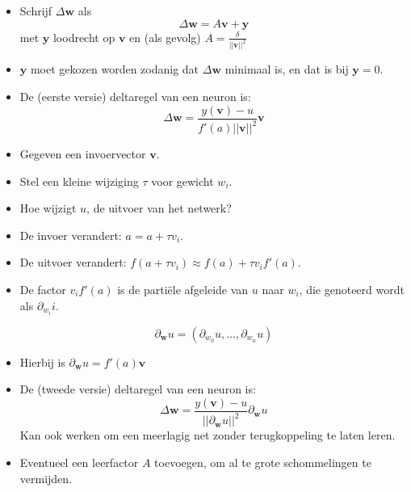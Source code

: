 \begin{itemize}
\begin{enumerate}
\begin{itemize}
\begin{itemize}
                \item Schrijf $\Delta \textbf{w}$ als
                $$\Delta \textbf{w} = A\textbf{v} + \textbf{y}$$
                met $\textbf{y}$ loodrecht op $\textbf{v}$ en (als gevolg) $A = \frac{\delta}{||\textbf{v}||^2}$ 
                \item $\textbf{y}$ moet gekozen worden zodanig dat $\Delta \textbf{w}$ minimaal is, en dat is bij $\textbf{y} = 0$.
                \item De (eerste versie) deltaregel van een neuron is:
                $$\Delta \textbf{w} = \frac{y(\textbf{v}) - u}{f'(a)||\textbf{v}||^2}\textbf{v}$$
            \end{itemize}
        \end{itemize}
        \begin{itemize}
            \item Gegeven een invoervector $\textbf{v}$.
            \item Stel een kleine wijziging $\tau$ voor gewicht $w_i$.
            \item Hoe wijzigt $u$, de uitvoer van het netwerk?
            \item De invoer verandert: $a = a + \tau v_i$.
            \item De uitvoer verandert: $f(a + \tau v_i) \approx f(a) + \tau v_i f'(a)$.
            \item De factor $v_i f'(a)$ is de partiële afgeleide van $u$ naar $w_i$, die genoteerd wordt als $\partial_{w_i}i$.
    
            $$\partial_{\textbf{w}}u = (\partial_{w_{0}}u, ..., \partial_{w_{n}}u)$$
            \item Hierbij is $\partial_{\textbf{w}}u = f'(a)\textbf{v}$
            \item De (tweede versie) deltaregel van een neuron is:
            $$\Delta \textbf{w} = \frac{y(\textbf{v}) - u}{||\partial_{\textbf{w}}u||^2}\partial_{\textbf{w}}u$$
            \good Kan ook werken om een meerlagig net zonder terugkoppeling te laten leren.
            \item Eventueel een leerfactor $A$ toevoegen, om al te grote schommelingen te vermijden.
        \end{itemize}

    \end{enumerate}
\end{itemize}
